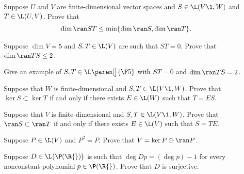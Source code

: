 \exercise  \label{5dimST}
Suppose $U$ and $V$ are finite-dimensional vector spaces and
\mbox{$S \in \L(V\1, W)$} and $T \in \L(U, V)$.  Prove that
\[
\dim \ran ST \le \min \{\dim \ran S, \dim \ran T\}.
\]
\exercisedisplayend


\exercise
\begin{SUBtheorem}
\item
Suppose $\dim V = 5$ and $S, T \in \L(V)$ are such that $ST = 0$. Prove that $\dim \ran TS \le 2$.
\item
Give an example of $S, T \in \L\paren[\big]{\F5}$ with $ST = 0$ and $\dim \ran TS = 2$.
\end{SUBtheorem}


\exercise\label{kerT1}
Suppose that $W$ is finite-dimensional and $S, T \in \L(V\1, W)$. Prove that $\ker S \subset \ker T$ if and only if there exists $E \in \L(W)$ such that \mbox{$T = E S$}.


\exercise
Suppose that $V$ is finite-dimensional and $S, T \in \L(V\1, W)$. Prove that $\ran S \subset \ran T$ if and only if there exists $E \in \L(V)$ such that \mbox{$S = T E$}.

\exercise
Suppose $P \in \L(V)$ and $P^2 = P$.  Prove that $V = \ker P \oplus \ran P$.


\exercise
Suppose $D \in \L\bigl(\P(\R{})\bigr)$ is such that $\deg Dp = (\deg p) - 1$ for every nonconstant polynomial $p \in \P(\R{})$. Prove that $D$ is surjective.\label{3polydeg}


